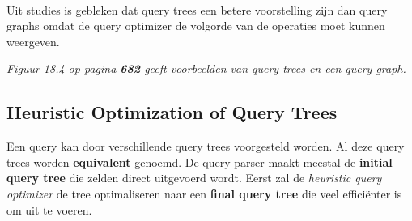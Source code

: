~

\noindent Uit studies is gebleken dat query trees een betere voorstelling zijn dan query graphs omdat de query optimizer de volgorde van de operaties moet kunnen weergeven.

\textit{Figuur 18.4 op pagina \textbf{682} geeft voorbeelden van query trees en een query graph.}


\subsection{Heuristic Optimization of Query Trees}
Een query kan door verschillende query trees voorgesteld worden. Al deze query trees worden \textbf{equivalent} genoemd. De query parser maakt meestal de \textbf{initial query tree} die zelden direct uitgevoerd wordt. Eerst zal de \textit{heuristic query optimizer} de tree optimaliseren naar een \textbf{final query tree} die veel effici\"enter is om uit te voeren.

~

